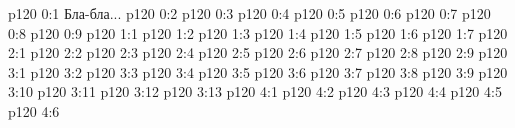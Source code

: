 \author{Мантутия Мелхиседек}
\vs p120 0:1  Бла-бла...
\vs p120 0:2 
\vs p120 0:3 
\vs p120 0:4 
\vs p120 0:5 
\vs p120 0:6 \pc 
\vs p120 0:7 \pc 
\vs p120 0:8 \pc 
\vs p120 0:9 \pc 
{}
\vs p120 1:1 
\vs p120 1:2 
\vs p120 1:3 
\vs p120 1:4 
\vs p120 1:5 
\vs p120 1:6 
\vs p120 1:7 
\vs p120 2:1 
\vs p120 2:2 
\vs p120 2:3 
\vs p120 2:4 
\vs p120 2:5 
\vs p120 2:6 
\vs p120 2:7 
\vs p120 2:8 
\vs p120 2:9 
\vs p120 3:1 
\vs p120 3:2 
\vs p120 3:3 
\vs p120 3:4 
\vs p120 3:5 
\vs p120 3:6 
\vs p120 3:7 
\vs p120 3:8 
\vs p120 3:9 
\vs p120 3:10 
\vs p120 3:11 
\vs p120 3:12 
\vs p120 3:13 
\vs p120 4:1 
\vs p120 4:2 \pc 
\vs p120 4:3 
\vs p120 4:4 
\vs p120 4:5 \pc 
\vs p120 4:6 
\quizlink
